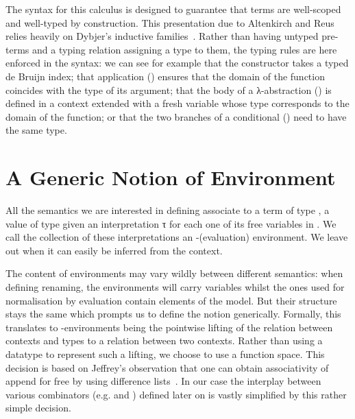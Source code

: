 \begin{minipage}[t]{0.5\textwidth}
\end{minipage}
\begin{minipage}[t]{0.5\textwidth}
\end{minipage}

The syntax for this calculus is designed to guarantee that terms are
well-scoped and well-typed by construction. This presentation due to
Altenkirch and Reus~\cite{altenkirch1999monadic} relies heavily on
Dybjer's inductive families~\cite{dybjer1991inductive}. Rather than
having untyped pre-terms and a typing relation assigning a type to
them, the typing rules are here enforced in the syntax: we can see for
example that the  constructor takes a typed de Bruijn index;
that application () ensures that the domain of the function
coincides with the type of its argument; that the body of a λ-abstraction
() is defined in a context extended with a fresh variable whose
type corresponds to the domain of the function; or that the two branches
of a conditional () need to have the same type.


\section{A Generic Notion of Environment}

All the semantics we are interested in defining associate to a term 
of type   , a value of type    given
an interpretation   {τ} for each one of its free variables
 in . We call the collection of these interpretations an
-(evaluation) environment. We leave out  when it can easily
be inferred from the context.

The content of environments may vary wildly between different semantics:
when defining renaming, the environments will carry variables whilst the
ones used for normalisation by evaluation contain elements of the model.
But their structure stays the same which prompts us to define the notion
generically. Formally, this translates to -environments being the
pointwise lifting of the relation  between contexts and types to a
relation between two contexts. Rather than using a datatype to represent
such a lifting, we choose to use a function space. This decision is based
on Jeffrey's observation that one can obtain associativity of append for
free by using difference lists~\cite{jeffrey2011assoc}. In our case the
interplay between various combinators (e.g.  and )
defined later on is vastly simplified by this rather simple decision.

